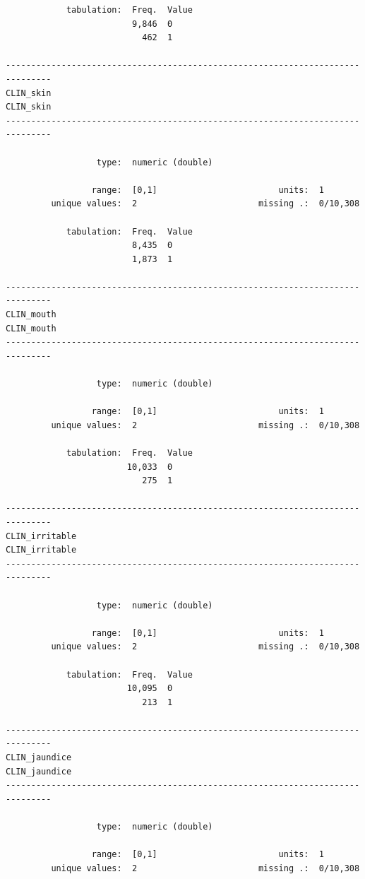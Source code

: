 \documentclass[
  letterpaper,
  DIV=11,
  numbers=noendperiod]{scrreprt}
\begin{document}
\begin{verbatim}
            tabulation:  Freq.  Value
                         9,846  0
                           462  1

-------------------------------------------------------------------------------
CLIN_skin                                                             CLIN_skin
-------------------------------------------------------------------------------

                  type:  numeric (double)

                 range:  [0,1]                        units:  1
         unique values:  2                        missing .:  0/10,308

            tabulation:  Freq.  Value
                         8,435  0
                         1,873  1

-------------------------------------------------------------------------------
CLIN_mouth                                                           CLIN_mouth
-------------------------------------------------------------------------------

                  type:  numeric (double)

                 range:  [0,1]                        units:  1
         unique values:  2                        missing .:  0/10,308

            tabulation:  Freq.  Value
                        10,033  0
                           275  1

-------------------------------------------------------------------------------
CLIN_irritable                                                   CLIN_irritable
-------------------------------------------------------------------------------

                  type:  numeric (double)

                 range:  [0,1]                        units:  1
         unique values:  2                        missing .:  0/10,308

            tabulation:  Freq.  Value
                        10,095  0
                           213  1

-------------------------------------------------------------------------------
CLIN_jaundice                                                     CLIN_jaundice
-------------------------------------------------------------------------------

                  type:  numeric (double)

                 range:  [0,1]                        units:  1
         unique values:  2                        missing .:  0/10,308


\end{verbatim}
\end{document}
